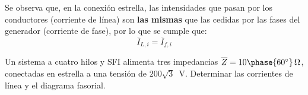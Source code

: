 	Se observa que, en la conexión estrella, las intensidades que pasan por los conductores (corriente de línea) son \textbf{las mismas} que las cedidas por las fases del generador (corriente de fase), por lo que se cumple que:
	\begin{equation}
	    \boxed{\overline{I}_{L,i}=\overline{I}_{f,i}}
	\end{equation}
	

	
	
    \vspace{4mm}
    \begin{example}\label{ej.3-1}
	    Un sistema a cuatro hilos y SFI alimenta tres impedancias $\overline{Z}=10\phase{60^\circ}\,\Omega$, conectadas en estrella a una tensión de $200\sqrt{3}\,$ \si{\volt}. Determinar las corrientes de línea y el diagrama fasorial.
     
        \vspace{1mm}
	    \hspace*{-5mm}\hrulefill
        
        \vspace{4mm}
    

\end{example}
